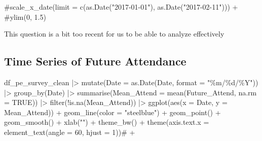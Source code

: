 \documentclass[
  letterpaper,
  DIV=11,
  numbers=noendperiod]{scrartcl}
\newenvironment{Shaded}{\begin{snugshade}}{\end{snugshade}}
\newcommand{\AttributeTok}[1]{\textcolor[rgb]{0.40,0.45,0.13}{#1}}
\newcommand{\CommentTok}[1]{\textcolor[rgb]{0.37,0.37,0.37}{#1}}
\newcommand{\ConstantTok}[1]{\textcolor[rgb]{0.56,0.35,0.01}{#1}}
\newcommand{\DecValTok}[1]{\textcolor[rgb]{0.68,0.00,0.00}{#1}}
\newcommand{\FunctionTok}[1]{\textcolor[rgb]{0.28,0.35,0.67}{#1}}
\newcommand{\NormalTok}[1]{\textcolor[rgb]{0.00,0.23,0.31}{#1}}
\newcommand{\SpecialCharTok}[1]{\textcolor[rgb]{0.37,0.37,0.37}{#1}}
\newcommand{\StringTok}[1]{\textcolor[rgb]{0.13,0.47,0.30}{#1}}
\begin{document}
\begin{Shaded}
\begin{Highlighting}[]
  \CommentTok{\#scale\_x\_date(limit = c(as.Date("2017{-}01{-}01"), as.Date("2017{-}02{-}11"))) +}
  \CommentTok{\#ylim(0, 1.5)}
\end{Highlighting}
\end{Shaded}

This question is a bit too recent for us to be able to analyze
effectively

\hypertarget{time-series-of-future-attendance}{%
\subsection{Time Series of Future
Attendance}\label{time-series-of-future-attendance}}

\begin{Shaded}
\begin{Highlighting}[]
\NormalTok{df\_pe\_survey\_clean }\SpecialCharTok{|\textgreater{}}
  \FunctionTok{mutate}\NormalTok{(}\AttributeTok{Date =} \FunctionTok{as.Date}\NormalTok{(Date, }\AttributeTok{format =} \StringTok{"\%m/\%d/\%Y"}\NormalTok{)) }\SpecialCharTok{|\textgreater{}}
  \FunctionTok{group\_by}\NormalTok{(Date) }\SpecialCharTok{|\textgreater{}}
  \FunctionTok{summarise}\NormalTok{(}\AttributeTok{Mean\_Attend =} \FunctionTok{mean}\NormalTok{(Future\_Attend, }\AttributeTok{na.rm =} \ConstantTok{TRUE}\NormalTok{)) }\SpecialCharTok{|\textgreater{}}
  \FunctionTok{filter}\NormalTok{(}\SpecialCharTok{!}\FunctionTok{is.na}\NormalTok{(Mean\_Attend)) }\SpecialCharTok{|\textgreater{}} 
  \FunctionTok{ggplot}\NormalTok{(}\FunctionTok{aes}\NormalTok{(}\AttributeTok{x =}\NormalTok{ Date, }\AttributeTok{y =}\NormalTok{ Mean\_Attend)) }\SpecialCharTok{+}
  \FunctionTok{geom\_line}\NormalTok{(}\AttributeTok{color =} \StringTok{"steelblue"}\NormalTok{) }\SpecialCharTok{+}
  \FunctionTok{geom\_point}\NormalTok{() }\SpecialCharTok{+}
  \FunctionTok{geom\_smooth}\NormalTok{() }\SpecialCharTok{+}
  \FunctionTok{xlab}\NormalTok{(}\StringTok{""}\NormalTok{) }\SpecialCharTok{+}
  \FunctionTok{theme\_bw}\NormalTok{() }\SpecialCharTok{+}
  \FunctionTok{theme}\NormalTok{(}\AttributeTok{axis.text.x =} \FunctionTok{element\_text}\NormalTok{(}\AttributeTok{angle =} \DecValTok{60}\NormalTok{, }\AttributeTok{hjust =} \DecValTok{1}\NormalTok{))}\CommentTok{\# +}
\end{Highlighting}
\end{Shaded}
\end{document}
